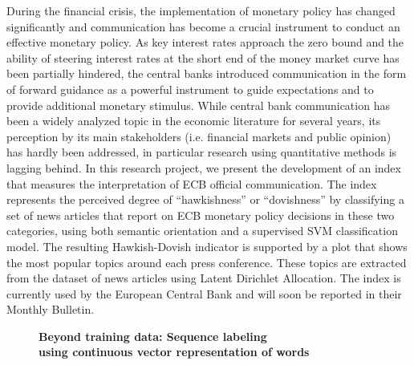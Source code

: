 \documentclass[10pt, a4paper, twopage, headinclude, footinclude, BCOR5mm]{book}
\begin{document}
During the financial crisis, the implementation of monetary policy has changed significantly and communication has become a crucial instrument to conduct an effective monetary policy. As key interest rates approach the zero bound and the ability of steering interest rates at the short end of the money market curve has been partially hindered, the central banks introduced communication in the form of forward guidance as a powerful instrument to guide expectations and to provide additional monetary stimulus.  While central bank communication has been a widely analyzed topic in the economic literature for several years, its perception by its main stakeholders (i.e. financial markets and public opinion) has hardly been addressed, in particular research using quantitative methods is lagging behind. In this research project, we present the development of an index that measures the interpretation of ECB official communication. The index represents the perceived degree of “hawkishness” or “dovishness”  by classifying a set of news articles that report on ECB monetary policy decisions in these two categories, using both semantic orientation and a supervised SVM classification model. The resulting Hawkish-Dovish indicator is supported by a plot that shows the most popular topics around each press conference. These topics are extracted from the dataset of news articles using Latent Dirichlet Allocation. The index is currently used by the European Central Bank and will soon be reported in their Monthly Bulletin.  

\newpage

\begin{figure}[t!]
\centering
\large\textbf{Beyond training data: Sequence labeling \\ using continuous vector representation of words}
\vspace*{0.5cm}
\end{figure}
\end{document}
